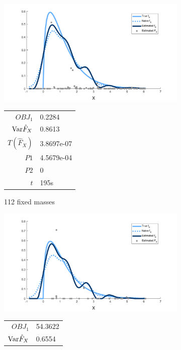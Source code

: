 \begin{figure}
	\centering
	\begin{subfigure}[b]{0.49\textwidth}
		\centering
		\includegraphics[width = \textwidth]{Figures/Deconvolution/fixed_masses_example.png}
		\begin{tabular}{r l}
			$OBJ_1$ & 0.2284\\
			$\mathrm{Var} \hat{F}_X$ & 0.8613\\
			$T(\hat{F}_X)$ & 3.8697e-07\\
			$P1$ & 4.5679e-04\\
			$P2$ & 0\\
			$t$ & 195s
		\end{tabular}
		\caption{112 fixed masses}
		\label{fig:fixed masses example}
	\end{subfigure}
	\hfill
	\begin{subfigure}[b]{0.49\textwidth}
		\centering
		\includegraphics[width = \textwidth]{Figures/Deconvolution/moving_masses_m40_example.png}
		\begin{tabular}{r l}
			$OBJ_1$ & 54.3622\\
			$\mathrm{Var} \hat{F}_X$ & 0.6554\\

\end{tabular}
\end{subfigure}
\end{figure}
